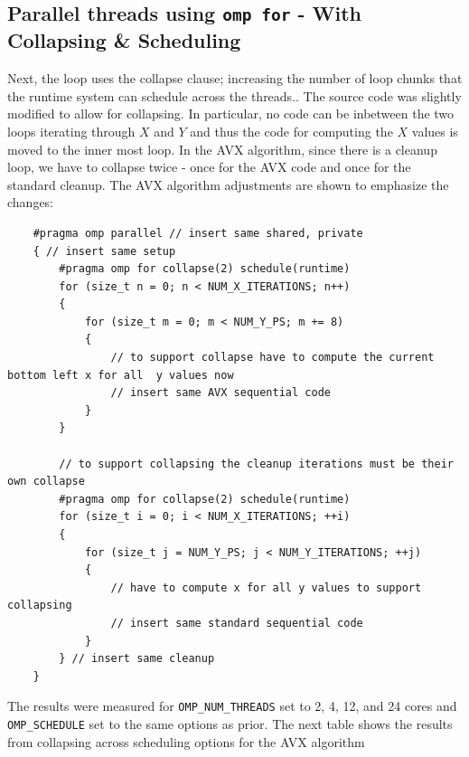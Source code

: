 \documentclass{article}
\begin{document}
\subsection{Parallel threads using \texttt{omp for} - With Collapsing \& Scheduling}
Next, the loop uses the collapse clause; increasing the number of loop chunks that
the runtime system can schedule across the threads.. The source code was slightly 
modified to allow for collapsing. In particular, no code can be inbetween the two loops 
iterating through $X$ and $Y$ and thus the code for computing the $X$ values is moved to the 
inner most loop. In the AVX algorithm, since there is a cleanup loop, we have to collapse twice - once for the AVX code and once for the standard cleanup.
The AVX algorithm adjustments are shown to emphasize the changes:
\newpage
\begin{lstlisting}
    #pragma omp parallel // insert same shared, private
    { // insert same setup
        #pragma omp for collapse(2) schedule(runtime)
        for (size_t n = 0; n < NUM_X_ITERATIONS; n++)
        {
            for (size_t m = 0; m < NUM_Y_PS; m += 8)
            {
                // to support collapse have to compute the current bottom left x for all  y values now
                // insert same AVX sequential code
            }
        }

        // to support collapsing the cleanup iterations must be their own collapse
        #pragma omp for collapse(2) schedule(runtime)
        for (size_t i = 0; i < NUM_X_ITERATIONS; ++i)
        {
            for (size_t j = NUM_Y_PS; j < NUM_Y_ITERATIONS; ++j)
            {
                // have to compute x for all y values to support collapsing
                // insert same standard sequential code
            }
        } // insert same cleanup
    }
\end{lstlisting}
The results were measured for \texttt{OMP\_NUM\_THREADS} set to 2, 4, 12, and 24 cores and \texttt{OMP\_SCHEDULE} set to
the same options as prior.
The next table shows the results from collapsing across scheduling options for the AVX algorithm
\end{document}

